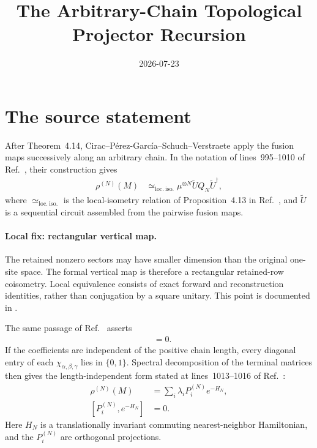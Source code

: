 \documentclass{article}
\title{The Arbitrary-Chain Topological Projector Recursion}
\author{}
\date{2026-07-23}
\begin{document}
\maketitle
{}

\section{The source statement}

After Theorem~4.14, Cirac--P\'erez-Garc\'ia--Schuch--Verstraete apply the
fusion maps successively along an arbitrary chain. In the notation of
lines~995--1010 of Ref.~\cite{Cirac2016MPDO_arXiv}, their construction gives
\begin{align}
    \rho^{(N)}(M)
    &\simeq_{\mathrm{loc.\ iso.}}
      \mu^{\otimes N}\widetilde UQ_N\widetilde U^\dagger,
    \label{eq:cpsv16_topological_projector_recursion_source_chain_decomposition}
\end{align}
where $\simeq_{\mathrm{loc.\ iso.}}$ is the local-isometry relation of
Proposition~4.13 in Ref.~\cite{Cirac2016MPDO_arXiv}, and $\widetilde U$ is a
sequential circuit assembled from the pairwise fusion maps.

\paragraph{Local fix: rectangular vertical map.}
The retained nonzero sectors may have smaller dimension than the original
one-site space. The formal vertical map is therefore a rectangular
retained-row coisometry. Local equivalence consists of exact forward and
reconstruction identities, rather than conjugation by a square unitary. This
point is documented in
.

The same passage of Ref.~\cite{Cirac2016MPDO_arXiv} asserts
\begin{align}
    [\mu^{\otimes N},\widetilde UQ_N\widetilde U^\dagger]
    &=0.
    \label{eq:cpsv16_topological_projector_recursion_source_commutator}
\end{align}
If the coefficients are independent of the positive chain length, every
diagonal entry of each $\chi_{\alpha,\beta,\gamma}$ lies in $\{0,1\}$.
Spectral decomposition of the terminal matrices then gives the
length-independent form stated at lines~1013--1016 of
Ref.~\cite{Cirac2016MPDO_arXiv}:
\begin{align}
    \rho^{(N)}(M)
    &=\sum_i\lambda_iP_i^{(N)}e^{-H_N},
    \label{eq:cpsv16_topological_projector_recursion_source_gibbs_decomposition}\\
    [P_i^{(N)},e^{-H_N}]
    &=0.
    \label{eq:cpsv16_topological_projector_recursion_source_gibbs_commutator}
\end{align}
Here $H_N$ is a translationally invariant commuting nearest-neighbor
Hamiltonian, and the $P_i^{(N)}$ are orthogonal projections.
\end{document}
